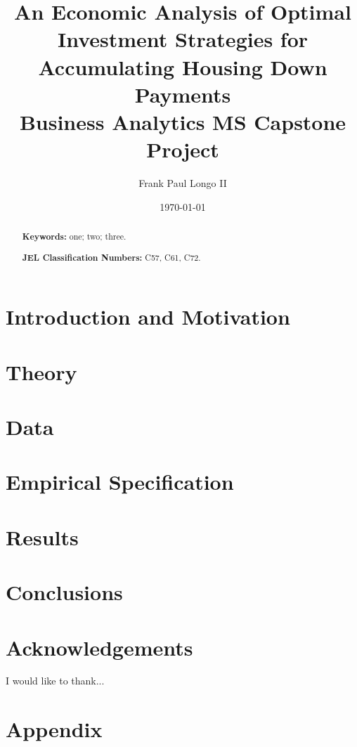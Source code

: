 \documentclass[10pt]{article}
\title{An Economic Analysis of Optimal Investment Strategies for Accumulating Housing Down Payments\\
       {\large Business Analytics MS Capstone Project}}
\author{Frank Paul Longo II}
\date{\today}
\begin{document}
\maketitle

\begin{abstract}


\bigskip
\bigskip

\noindent
\textbf{Keywords:} one; two; three.

\bigskip

\noindent
\textbf{JEL Classification Numbers:} C57, C61, C72.
\end{abstract}

\vfill
\eject

\section{Introduction and Motivation}


\section{Theory}


\section{Data}


\section{Empirical Specification}


\section{Results}


\section{Conclusions}


\section*{Acknowledgements}
I would like to thank...

\section*{Appendix}







\end{document}
